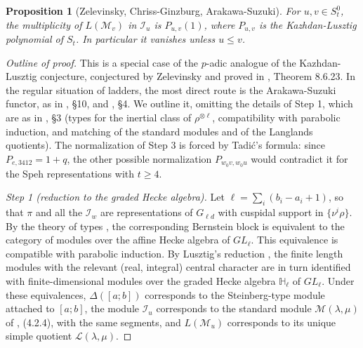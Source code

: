 \documentclass[a4paper,12pt,leqno]{amsart}
\newcommand{\caI}{\mathcal{I}}
\newcommand{\caM}{\mathcal{M}}
\theoremstyle{plain}
\newtheorem{prop}[thm]{Proposition}
\theoremstyle{definition}
\theoremstyle{definition}
\begin{document}
\begin{prop}[Zelevinsky, Chriss-Ginzburg, Arakawa-Suzuki]\label{fact:KL} For $u,v\in S_t^0$,
 the multiplicity of $L(\caM_v)$ in $\caI_u$ is $P_{u,v}(1)$, where $P_{u,v}$ is the Kazhdan-Lusztig
 polynomial of $S_t$. In particular it vanishes unless $u\leq v$.
\end{prop}

\begin{proof}[Outline of proof]
This is a special case of the $p$-adic analogue of the Kazhdan-Lusztig conjecture, conjectured by
Zelevinsky \cite{Zel81, Zel85} and proved in \cite{CG97}, Theorem 8.6.23. In the regular situation
 of ladders, the most direct route is the Arakawa-Suzuki functor, as in \cite{LM18}, \S 10,
 and \cite{BC15}, \S 4. We outline it, omitting the details of Step 1, which are as in \cite{BC15},
\S3 (types for the inertial class of $\rho^{\otimes\ell}$, compatibility with parabolic induction,
and matching of the standard modules and of the Langlands quotients). The normalization of Step 3 is
forced by Tadi\'c's formula: since $P_{e,3412}=1+q$, the other possible normalization
$P_{w_0v,w_0u}$ would contradict it for the Speh representations with $t\geq4$.

\emph{Step 1 (reduction to the graded Hecke algebra).} Let $\ell=\sum_i(b_i-a_i+1)$, so that $\pi$
and all the $\caI_w$ are representations of $G_{\ell d}$ with cuspidal support in $\{\nu^i\rho\}$.
By the theory of types \cite{BK93}, the corresponding Bernstein block is equivalent to the category
of modules over the affine Hecke algebra of $GL_\ell$. This equivalence is compatible with
parabolic induction.
By Lusztig's reduction \cite{Lus89}, the finite length modules with the relevant (real, integral)
central character
are in turn identified with finite-dimensional modules over the graded Hecke algebra $\mathbb{H}_\ell$ of
 $GL_\ell$. Under these equivalences, $\Delta([a;b])$ corresponds to the Steinberg-type module
 attached to $[a;b]$,
 the module $\caI_u$ corresponds to the standard module $\mathcal{M}(\lambda,\mu)$ of \cite{BC15}, (4.2.4),
  with the same segments, and $L(\caM_u)$ corresponds to its unique simple quotient
  $\mathcal{L}(\lambda,\mu)$.


\end{proof}
\end{document}
